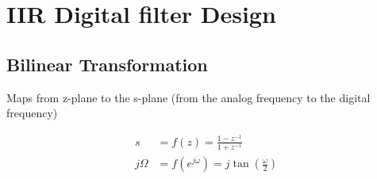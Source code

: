 \section{IIR Digital filter Design}
\subsection{Bilinear Transformation}
Maps from z-plane to the s-plane (from the analog frequency to the digital
frequency)

\begin{align}
s &= f(z) = \frac{1-z^{-1}}{1+z^{-1}}\\
j\Omega &= f(e^{j\omega}) = j \tan \left( \frac{\omega}{2} \right)
\end{align}


